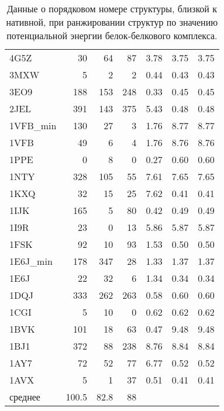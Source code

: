 \begin{table}[h]
\begin{center}
\begin{tabular}{ l | r | r | r | c | c | c }
       4G5Z & 30 & 64 & 87 & 3.78 & 3.75 & 3.75 \\
       3MXW & 5 & 2 & 2 & 0.44 & 0.43 & 0.43 \\
       3EO9 & 188 & 153 & 248 & 0.33 & 0.45 & 0.45 \\
       2JEL & 391 & 143 & 375 & 5.43 & 0.48 & 0.48 \\
       1VFB\_min & 130 & 27 & 3 & 1.76 & 8.77 & 8.77 \\
       1VFB & 49 & 6 & 4 & 1.76 & 8.76 & 8.76 \\
       1PPE & 0 & 8 & 0 & 0.27 & 0.60 & 0.60 \\
       1NTY & 328 & 105 & 55 & 7.61 & 7.65 & 7.65 \\
       1KXQ & 32 & 15 & 25 & 7.62 & 0.41 & 0.41 \\
       1IJK & 165 & 5 & 80 & 0.42 & 0.49 & 0.49 \\
       1I9R & 23 & 0 & 13 & 5.86 & 5.87 & 5.87 \\
       1FSK & 92 & 10 & 93 & 1.53 & 0.50 & 0.50 \\
       1E6J\_min & 178 & 347 & 28 & 1.33 & 1.37 & 1.37 \\
       1E6J & 22 & 32 & 6 & 1.34 & 0.34 & 0.34 \\
       1DQJ & 333 & 262 & 263 & 0.58 & 0.60 & 0.60 \\
       1CGI & 5 & 10 & 0 & 0.62 & 0.62 & 0.62 \\
       1BVK & 101 & 18 & 63 & 0.47 & 9.48 & 9.48 \\
       1BJ1 & 372 & 88 & 238 & 8.76 & 8.84 & 8.84 \\
       1AY7 & 72 & 52 & 77 & 6.77 & 0.52 & 0.52 \\
       1AVX & 5 & 1 & 37 & 0.51 & 0.41 & 0.41 \\
       \hline
       среднее & 100.5 & 82.8 & 88 &
    \end{tabular}
    \end{center}
    \caption{Данные о порядковом номере структуры, близкой к нативной, при ранжировании структур по значению потенциальной энергии белок-белкового комплекса. }
    \label{table_res_1}
  \end{table}

